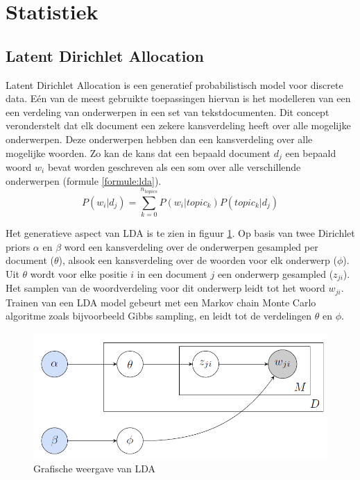 \section{Statistiek}

\subsection{Latent Dirichlet Allocation}
Latent Dirichlet Allocation\cite{Blei2012} is een generatief probabilistisch model voor discrete data. E\'en van de meest gebruikte toepassingen hiervan is het modelleren van een een verdeling van onderwerpen in een set van tekstdocumenten. Dit concept veronderstelt dat elk document een zekere kansverdeling heeft over alle mogelijke onderwerpen. Deze onderwerpen hebben dan een kansverdeling over alle mogelijke woorden. Zo kan de kans dat een bepaald document $d_j$ een bepaald woord $w_i$ bevat worden geschreven als een som over alle verschillende onderwerpen (formule \ref{formule:lda}).
\begin{equation}
    P(w_i | d_j) = \sum\limits_{k=0}^{n_{topics}}P(w_i|topic_k)P(topic_k|d_j)
    \label{formule:lda}
\end{equation}

Het generatieve aspect van LDA is te zien in figuur \ref{fig:lda}. Op basis van twee Dirichlet priors $\alpha$ en $\beta$ word een kansverdeling over de onderwerpen gesampled per document ($\theta$), alsook een kansverdeling over de woorden voor elk onderwerp ($\phi$). Uit $\theta$ wordt voor elke positie $i$ in een document $j$ een onderwerp gesampled ($z_{ji}$). Het samplen van de woordverdeling voor dit onderwerp leidt tot het woord $w_{ji}$. Trainen van een LDA model gebeurt met een Markov chain Monte Carlo algoritme zoals bijvoorbeeld Gibbs sampling, en leidt tot de verdelingen $\theta$ en $\phi$.
\begin{figure}[tb]
    \centering
    \includegraphics[width=\linewidth]{Images/lda.png}
    \caption{Grafische weergave van LDA}
    \label{fig:lda}
\end{figure}


